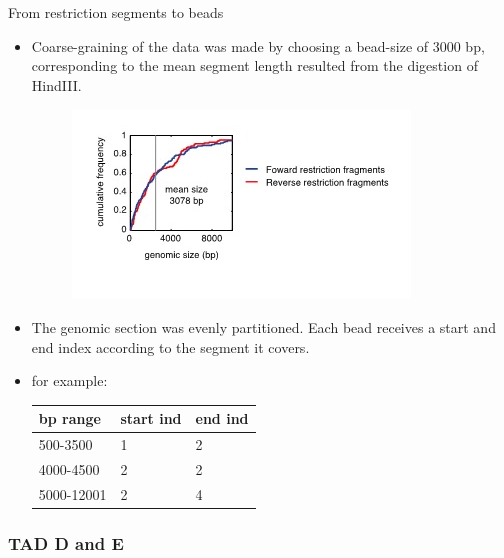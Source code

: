 \documentclass[8pt]{beamer}
\begin{document}
\begin{frame}{From restriction segments to beads}
\begin{itemize}
\item Coarse-graining of the data was made by choosing a bead-size of 3000 bp, corresponding to the mean segment length resulted from the digestion of HindIII. 

\begin{figure}[H]
\includegraphics[scale=0.55]{restrictionSegmentLengthDistributionLucaetal}
\end{figure}
\item The genomic section was evenly partitioned. Each bead receives a start and end index according to the segment it covers. 
\item for example: 
\begin{tabular}[H]{|l| l| l|}
\hline
bp range & start ind & end ind\\
\hline
500-3500   & 1         & 2 \\
4000-4500  & 2         & 2 \\   
5000-12001 & 2         & 4 \\       
\hline  
\end{tabular}
\end{itemize}
\end{frame}

\subsubsection{TAD D and E}\label{subsubsection_tadDAndE}
\end{document}

